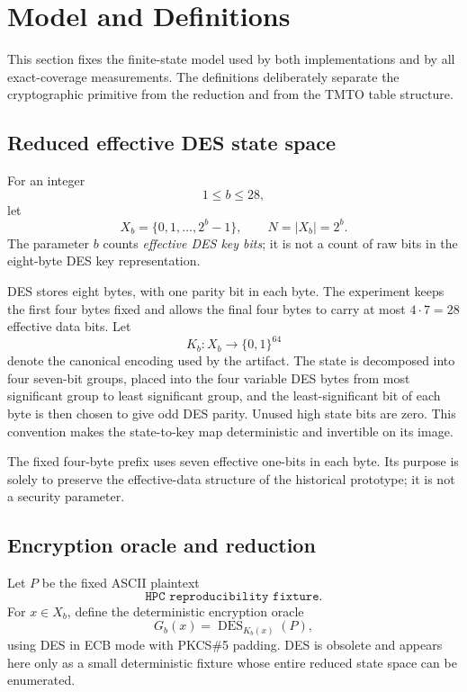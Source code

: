 \section{Model and Definitions}
\label{sec:model}

This section fixes the finite-state model used by both implementations and by
all exact-coverage measurements.  The definitions deliberately separate the
cryptographic primitive from the reduction and from the TMTO table structure.

\subsection{Reduced effective DES state space}

For an integer
\[
    1\leq b\leq 28,
\]
let
\[
    X_b=\{0,1,\ldots,2^b-1\},
    \qquad
    N=|X_b|=2^b.
\]
The parameter $b$ counts \emph{effective DES key bits}; it is not a count of
raw bits in the eight-byte DES key representation.

DES stores eight bytes, with one parity bit in each byte.  The experiment
keeps the first four bytes fixed and allows the final four bytes to carry at
most $4\cdot 7=28$ effective data bits.  Let
\[
    K_b:X_b\longrightarrow\{0,1\}^{64}
\]
denote the canonical encoding used by the artifact.  The state is decomposed
into four seven-bit groups, placed into the four variable DES bytes from most
significant group to least significant group, and the least-significant bit of
each byte is then chosen to give odd DES parity.  Unused high state bits are
zero.  This convention makes the state-to-key map deterministic and invertible
on its image.

The fixed four-byte prefix uses seven effective one-bits in each byte.  Its
purpose is solely to preserve the effective-data structure of the historical
prototype; it is not a security parameter.

\subsection{Encryption oracle and reduction}

Let $P$ be the fixed ASCII plaintext
\[
  \texttt{HPC reproducibility fixture}.
\]
For $x\in X_b$, define the deterministic encryption oracle
\[
    G_b(x)=
    \operatorname{DES}_{K_b(x)}(P),
\]
using DES in ECB mode with PKCS\#5 padding.  DES is obsolete and appears here
only as a small deterministic fixture whose entire reduced state space can be
enumerated.

